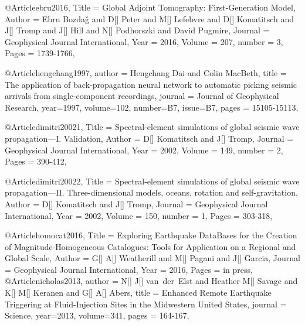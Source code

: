 @Article{ebru2016,
  Title                    = {Global Adjoint Tomography: First-Generation Model},
  Author                   = {Ebru Bozda\v{g} and D[] Peter and M[] Lefebvre and D[] Komatitsch and J[] Tromp and J[] Hill and N[] Podhorszki and David Pugmire},
  Journal                  = Geophysical Journal International,
  Year                     = {2016},
  Volume                   = {207},
  number                   = {3},
  Pages                    = {1739-1766},
}

@Article{hengchang1997,
  author =	 {Hengchang Dai and Colin MacBeth},
  title =	 {The application of back-propagation neural network to automatic picking seismic arrivals from single-component recordings},
  journal =	 {Journal of Geophysical Research},
  year=1997,
  volume=102,
  number=B7,
  issue=B7,
  pages =	 {15105-15113},
}


@Article{dimitri20021,
  Title                    = {Spectral-element simulations of global seismic wave propagation—I. Validation},
  Author                   = {D[] Komatitsch and J[] Tromp},
  Journal                  = Geophysical Journal International,
  Year                     = {2002},
  Volume                   = {149},
  number                   = {2},
  Pages                    = {390-412},
}

@Article{dimitri20022,
  Title                    = {Spectral-element simulations of global seismic wave propagation—II. Three-dimensional models, oceans, rotation and self-gravitation},
  Author                   = {D[] Komatitsch and J[] Tromp},
  Journal                  = Geophysical Journal International,
  Year                     = {2002},
  Volume                   = {150},
  number                   = {1},
  Pages                    = {303-318},
}



@Article{homocat2016,
  Title                    = {Exploring Earthquake DataBases for the Creation of Magnitude-Homogeneous Catalogues: Tools for Application on a Regional and Global Scale},
  Author                   = {G[] A[] Weatherill and M[] Pagani and J[] Garcia},
  Journal                  = {Geophysical Journal International},
  Year                     = {2016},
  Pages                    = {in press},
}
@Article{nicholas2013,
  author =	 {N[] J[] van~der~Elst and Heather M[] Savage and K[] M[] Keranen and G[] A[] Abers},
  title =	 {Enhanced Remote Earthquake Triggering at Fluid-Injection Sites in the Midwestern United States},
  journal =	 {Science},
  year=2013,
  volume=341,
  pages =	 {164-167},
}

